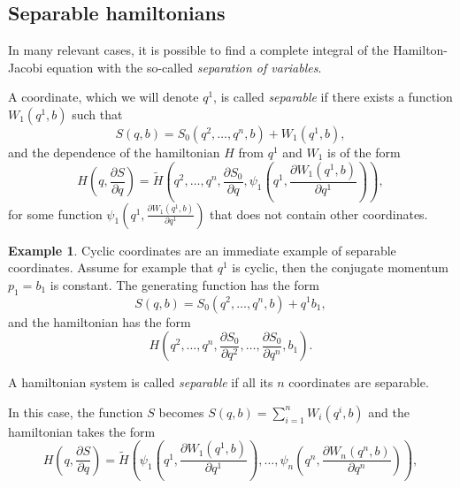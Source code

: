 \documentclass[english,fontsize=11pt,paper=b5]{scrbook}
\theoremstyle{definition}
\newtheorem{example}{Example}[chapter]
\begin{document}
    \subsection{Separable hamiltonians}\label{sec:sepsys}

    In many relevant cases, it is possible to find a complete integral of the Hamilton-Jacobi equation with the so-called \emph{separation of variables}.

    \begin{tcolorbox}
      A coordinate, which we will denote $q^1$, is called \emph{separable} if there exists a function $W_1(q^1, b)$ such that
      \begin{equation}
        S(q,b) = S_0(q^2, \ldots, q^n, b) + W_1(q^1, b),
      \end{equation}
      and the dependence of the hamiltonian $H$ from $q^1$ and $W_1$ is of the form
      \begin{equation}
        H\left(q,\frac{\partial S}{\partial q}\right) = \widetilde H\left(q^2, \ldots, q^n , \frac{\partial S_0}{\partial q}, \psi_1\left(q^1, \frac{\partial W_1(q^1, b)}{\partial q^1}\right)
        \right),
      \end{equation}
      for some function $\psi_1\left(q^1, \frac{\partial W_1(q^1, b)}{\partial q^1}\right)$ that does not contain other coordinates.
    \end{tcolorbox}

    \begin{example}
      Cyclic coordinates are an immediate example of separable coordinates.
      Assume for example that $q^1$ is cyclic, then the conjugate momentum $p_1 = b_1$ is constant.
      The generating function has the form
      \begin{equation}
        S(q,b) = S_0(q^2, \ldots, q^n, b) + q^1 b_1,
      \end{equation}
      and the hamiltonian has the form
      \begin{equation}
        H(q^2, \ldots, q^n, \frac{\partial S_0}{\partial q^2}, \ldots, \frac{\partial S_0}{\partial q^n}, b_1).
      \end{equation}
    \end{example}

    \begin{tcolorbox}
      A hamiltonian system is called \emph{separable} if all its $n$ coordinates are separable.
    \end{tcolorbox}

    In this case, the function $S$ becomes $S(q,b) = \sum_{i=1}^n W_i(q^i, b)$ and the hamiltonian takes the form
    \begin{equation}
      H\left(q,\frac{\partial S}{\partial q}\right) = \widetilde H\left(
        \psi_1\left(q^1, \frac{\partial W_1(q^1, b)}{\partial q^1}\right),
        \ldots,
        \psi_n\left(q^n, \frac{\partial W_n(q^n, b)}{\partial q^n}\right)
      \right),
    \end{equation}
\end{document}

